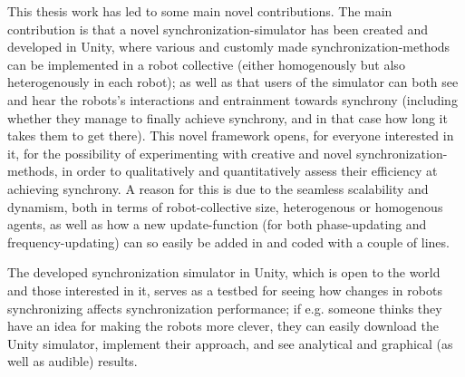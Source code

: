 This thesis work has led to some main novel contributions. The main contribution is that a novel synchronization-simulator has been created and developed in Unity, where various and customly made synchronization-methods can be implemented in a robot collective (either homogenously but also heterogenously in each robot); as well as that users of the simulator can both see and hear the robots's interactions and entrainment towards synchrony (including whether they manage to finally achieve synchrony, and in that case how long it takes them to get there). This novel framework opens, for everyone interested in it, for the possibility of experimenting with creative and novel synchronization-methods, in order to qualitatively and quantitatively assess their efficiency at achieving synchrony. A reason for this is due to the seamless scalability and dynamism, both in terms of robot-collective size, heterogenous or homogenous agents, as well as how a new update-function (for both phase-updating and frequency-updating) can so easily be added in and coded with a couple of lines.

The developed synchronization simulator in Unity, which is open to the world and those interested in it, serves as a testbed for seeing how changes in robots synchronizing affects synchronization performance; if e.g. someone thinks they have an idea for making the robots more clever, they can easily download the Unity simulator, implement their approach, and see analytical and graphical (as well as audible) results.

